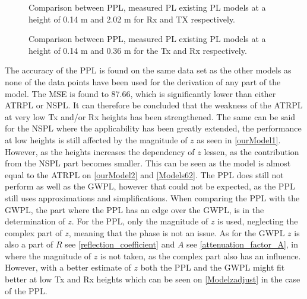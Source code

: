 \begin{figure}[H]
\centering

\caption{Comparison between PPL, measured PL existing PL models at a height of 0.14 m and 2.02 m for Rx and TX respectively.}
\label{ourModel2}
\end{figure}

\begin{figure}[H]
\centering

\caption{Comparison between PPL, measured PL existing PL models at a height of 0.14 m and 0.36 m for the Tx and Rx respectively.}
\label{Models62}
\end{figure}


The accuracy of the PPL is found on the same data set as the other models as none of the data points have been used for the derivation of any part of the model. The MSE is found to 87.66, which is significantly lower than either ATRPL or NSPL. It can therefore be concluded that the weakness of the ATRPL at very low Tx and/or Rx heights has been strengthened. The same can be said for the NSPL where the applicability has been greatly extended, the performance at low heights is still affected by the magnitude of $z$ as seen in \autoref{ourModel1}. However, as the heights increases the dependency of $z$ lessen, as the contribution from the NSPL part becomes smaller. This can be seen as the model is almost equal to the ATRPL on \autoref{ourModel2} and \autoref{Models62}. The PPL does still not perform as well as the GWPL, however that could not be expected, as the PPL still uses approximations and simplifications. When comparing the PPL with the GWPL, the part where the PPL has an edge over the GWPL, is in the determination of $z$. For the PPL, only the magnitude of $z$ is used, neglecting the complex part of $z$, meaning that the phase is not an issue. As for the GWPL $z$ is also a part of $R$ see \eqref{reflection_coefficient} and $A$ see \eqref{attenuation_factor_A}, in where the magnitude of $z$ is not taken, as the complex part also has an influence. However, with a better estimate of $z$ both the PPL and the GWPL might fit better at low Tx and Rx heights which can be seen on \autoref{Modelzadjust} in the case of the PPL. 


